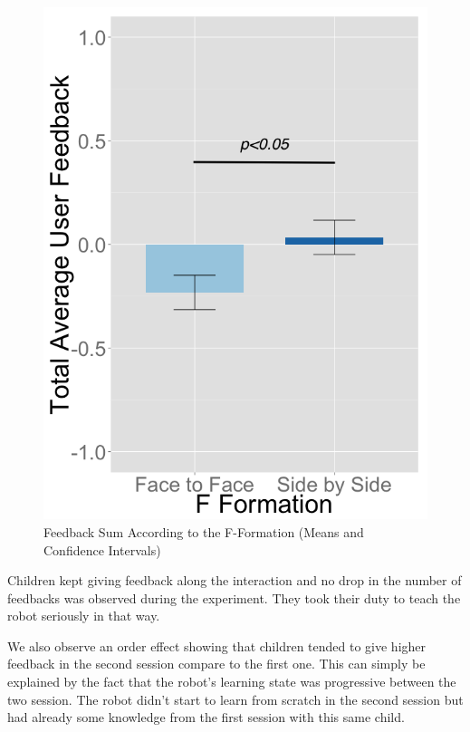 \documentclass[letterpaper, 10 pt, conference]{ieeeconf}  %
\begin{document}
 \begin{figure}
 	\centering
 	\includegraphics[width=0.58\linewidth]{figures/plots/userfeedback_fformation_se}
 	\caption{Feedback Sum According to the F-Formation (Means and Confidence Intervals)}
 	\label{fig:userfeedback_fformation_se}
 \end{figure}

Children kept giving feedback along the interaction and no drop in the number of feedbacks was observed during the experiment.
They took their duty to teach the robot seriously in that way.

We also observe an order effect showing that children tended to give higher feedback in the second session compare to the first one.
This can simply be explained by the fact that the robot's learning state was progressive between the two session. 
The robot didn't start to learn from scratch in the second session but had already some knowledge from the first session with this same child. 
\end{document}
